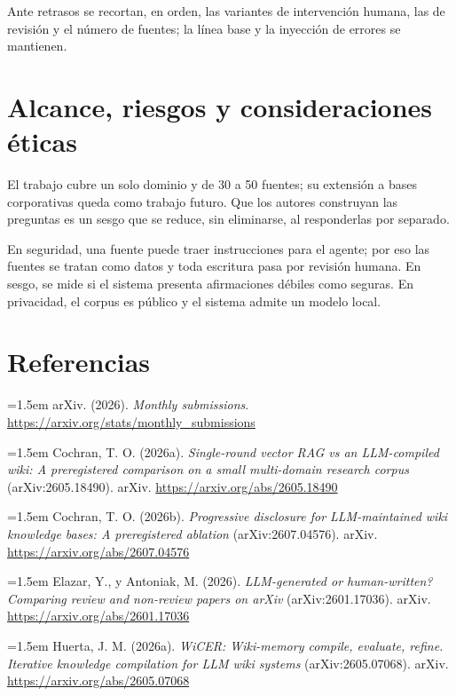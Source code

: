\documentclass[11pt,letterpaper]{article}
\newcommand{\refhang}[1]{\par\noindent\hangindent=1.5em\hangafter=1 #1\par}
\begin{document}
Ante retrasos se recortan, en orden, las variantes de intervención humana, las de revisión y el
número de fuentes; la línea base y la inyección de errores se mantienen.

\section{Alcance, riesgos y consideraciones éticas}

El trabajo cubre un solo dominio y de 30 a 50 fuentes; su extensión a bases corporativas queda
como trabajo futuro. Que los autores construyan las preguntas es un sesgo que se reduce,
sin eliminarse, al responderlas por separado.

En seguridad, una fuente puede traer instrucciones para el agente; por eso las fuentes se tratan
como datos y toda escritura pasa por revisión humana. En sesgo, se mide si el sistema presenta afirmaciones débiles como seguras. En privacidad, el corpus es
público y el sistema admite un modelo local.

\section*{Referencias}

\footnotesize\sloppy

\refhang{arXiv. (2026). \textit{Monthly submissions}. \url{https://arxiv.org/stats/monthly_submissions}}

\refhang{Cochran, T. O. (2026a). \textit{Single-round vector RAG vs an LLM-compiled wiki: A preregistered comparison on a small multi-domain research corpus} (arXiv:2605.18490). arXiv. \url{https://arxiv.org/abs/2605.18490}}

\refhang{Cochran, T. O. (2026b). \textit{Progressive disclosure for LLM-maintained wiki knowledge bases: A preregistered ablation} (arXiv:2607.04576). arXiv. \url{https://arxiv.org/abs/2607.04576}}

\refhang{Elazar, Y., y Antoniak, M. (2026). \textit{LLM-generated or human-written? Comparing review and non-review papers on arXiv} (arXiv:2601.17036). arXiv. \url{https://arxiv.org/abs/2601.17036}}

\refhang{Huerta, J. M. (2026a). \textit{WiCER: Wiki-memory compile, evaluate, refine. Iterative knowledge compilation for LLM wiki systems} (arXiv:2605.07068). arXiv. \url{https://arxiv.org/abs/2605.07068}}
\end{document}
